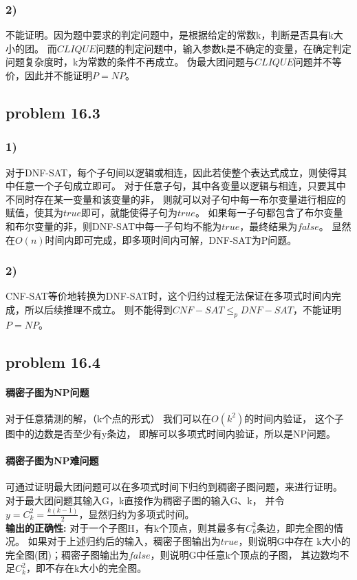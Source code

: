 \documentclass[11pt,a4paper,oneside,oldfontcommands]{ctexart}
\begin{document}
\subsubsection*{2)}
不能证明。因为题中要求的判定问题中，是根据给定的常数k，判断是否具有k大小的团。
而$CLIQUE$问题的判定问题中，输入参数k是不确定的变量，在确定判定问题复杂度时，k为常数的条件不再成立。
伪最大团问题与$CLIQUE$问题并不等价，因此并不能证明$P=NP$。
\newpage
{\subsection*{problem 16.3}}
\subsubsection*{1)}
对于DNF-SAT，每个子句间以逻辑或相连，因此若使整个表达式成立，则使得其中任意一个子句成立即可。
对于任意子句，其中各变量以逻辑与相连，只要其中不同时存在某一变量和该变量的非，
则就可以对子句中每一布尔变量进行相应的赋值，使其为$true$即可，就能使得子句为$true$。
如果每一子句都包含了布尔变量和布尔变量的非，则DNF-SAT中每一子句均不能为$true$，最终结果为$false$。
显然在$O(n)$时间内即可完成，即多项时间内可解，DNF-SAT为P问题。
\subsubsection*{2)}
CNF-SAT等价地转换为DNF-SAT时，这个归约过程无法保证在多项式时间内完成，所以后续推理不成立。
则不能得到$CNF-SAT\leq_p DNF-SAT$，不能证明$P=NP$。
{\subsection*{problem 16.4}}
\paragraph*{稠密子图为NP问题}
对于任意猜测的解，（k个点的形式）
我们可以在$O(k^2)$的时间内验证，
这个子图中的边数是否至少有y条边，
即解可以多项式时间内验证，所以是NP问题。
\paragraph*{稠密子图为NP难问题}
可通过证明最大团问题可以在多项式时间下归约到稠密子图问题，来进行证明。
对于最大团问题其输入G，k直接作为稠密子图的输入G、k，
并令$y=C_k^2=\frac{k(k-1)}{2}$，显然归约为多项式时间。\\
\hspace*{20pt}\textbf{输出的正确性: }
对于一个子图H，有k个顶点，则其最多有$C_k^2$条边，即完全图的情况。
如果对于上述归约后的输入，稠密子图输出为$true$，则说明G中存在
k大小的完全图(团)；稠密子图输出为$false$，则说明G中任意k个顶点的子图，
其边数均不足$C_k^2$，即不存在k大小的完全图。
\end{document}
